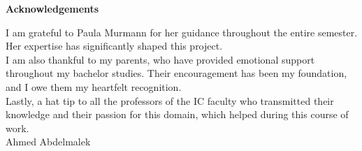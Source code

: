 
\thispagestyle{empty} %
\begin{center}
    \Large \textbf{Acknowledgements}\\[2cm]
\end{center}

\linespread{1.3}\selectfont %

\noindent
I am grateful to Paula Murmann for her guidance throughout the entire semester. Her expertise has significantly shaped this project.\\

\noindent
I am also thankful to my parents, who have provided emotional support throughout my bachelor studies. Their encouragement has been my foundation, and I owe them my heartfelt recognition.\\

\noindent
Lastly, a hat tip to all the professors of the IC faculty who transmitted their knowledge and their passion for this domain, which helped during this course of work.\\[2cm]

\hfill Ahmed Abdelmalek %